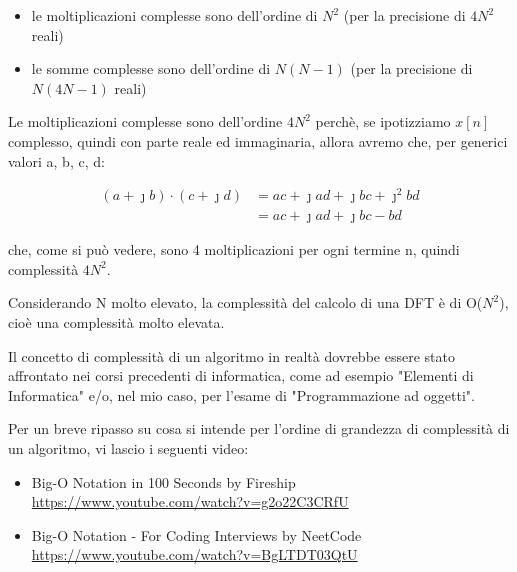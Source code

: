\begin{itemize}
    \item le moltiplicazioni complesse sono dell'ordine di $N^{2}$ (per la precisione di $4 N^{2}$ reali)
    \item le somme complesse sono dell'ordine di $N \left(N - 1\right)$ (per la precisione di $N \left(4N - 1\right)$ reali)
\end{itemize}

\begin{tcolorbox}
Le moltiplicazioni complesse sono dell'ordine $4 N^{2}$ perchè, se ipotizziamo $x\left[ n\right]$ complesso, quindi con parte reale ed immaginaria, allora avremo che, per generici valori a, b, c, d: 

{
    \Large 
    \begin{equation}
        \begin{split}
            \left(a + \jmath b\right)
            \cdot 
            \left(c + \jmath d\right)
            &= 
            a c + \jmath ad + \jmath bc + \jmath^{2}bd
            \\
            &=
            a c + \jmath ad + \jmath bc -bd
        \end{split}
    \end{equation}
}

che, come si può vedere, sono 4 moltiplicazioni per ogni termine n, quindi complessità $4 N^{2}$. 
\end{tcolorbox}

Considerando N molto elevato, la complessità del calcolo di una DFT è di O($N^{2}$), cioè una complessità molto elevata. \newline 

\begin{tcolorbox}
    Il concetto di complessità di un algoritmo in realtà dovrebbe essere stato affrontato nei corsi precedenti di informatica, 
    come ad esempio "Elementi di Informatica" e/o, nel mio caso, per l'esame di "Programmazione ad oggetti". \newline 

    Per un breve ripasso su cosa si intende per l'ordine di grandezza di complessità di un algoritmo, vi lascio i seguenti video: 

    \begin{itemize}
        \item  Big-O Notation in 100 Seconds by Fireship \\\url{https://www.youtube.com/watch?v=g2o22C3CRfU}
        \item Big-O Notation - For Coding Interviews by NeetCode \\\url{https://www.youtube.com/watch?v=BgLTDT03QtU}
    \end{itemize}
\end{tcolorbox}


